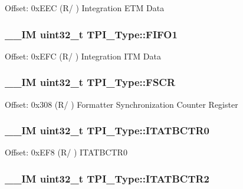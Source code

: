 Offset\-: 0x\-E\-E\-C (R/ ) Integration E\-T\-M Data \hypertarget{struct_t_p_i___type_a061372fcd72f1eea871e2d9c1be849bc}{
\subsubsection[{F\-I\-F\-O1}]{\setlength{\rightskip}{0pt plus 5cm}\-\_\-\-\_\-\-I\-M uint32\-\_\-t T\-P\-I\-\_\-\-Type\-::\-F\-I\-F\-O1}}\label{struct_t_p_i___type_a061372fcd72f1eea871e2d9c1be849bc}
Offset\-: 0x\-E\-F\-C (R/ ) Integration I\-T\-M Data \hypertarget{struct_t_p_i___type_ad6901bfd8a0089ca7e8a20475cf494a8}{
\subsubsection[{F\-S\-C\-R}]{\setlength{\rightskip}{0pt plus 5cm}\-\_\-\-\_\-\-I\-M uint32\-\_\-t T\-P\-I\-\_\-\-Type\-::\-F\-S\-C\-R}}\label{struct_t_p_i___type_ad6901bfd8a0089ca7e8a20475cf494a8}
Offset\-: 0x308 (R/ ) Formatter Synchronization Counter Register \hypertarget{struct_t_p_i___type_aaa573b2e073e76e93c51ecec79c616d0}{
\subsubsection[{I\-T\-A\-T\-B\-C\-T\-R0}]{\setlength{\rightskip}{0pt plus 5cm}\-\_\-\-\_\-\-I\-M uint32\-\_\-t T\-P\-I\-\_\-\-Type\-::\-I\-T\-A\-T\-B\-C\-T\-R0}}\label{struct_t_p_i___type_aaa573b2e073e76e93c51ecec79c616d0}
Offset\-: 0x\-E\-F8 (R/ ) I\-T\-A\-T\-B\-C\-T\-R0 \hypertarget{struct_t_p_i___type_ab358319b969d3fed0f89bbe33e9f1652}{
\subsubsection[{I\-T\-A\-T\-B\-C\-T\-R2}]{\setlength{\rightskip}{0pt plus 5cm}\-\_\-\-\_\-\-I\-M uint32\-\_\-t T\-P\-I\-\_\-\-Type\-::\-I\-T\-A\-T\-B\-C\-T\-R2}}\label{struct_t_p_i___type_ab358319b969d3fed0f89bbe33e9f1652}
